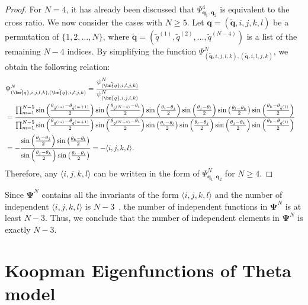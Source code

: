\documentclass[
amsmath,amssymb,
]{revtex4-2}
\begin{document}
\begin{proof}
For $N = 4$, it has already been discussed that $\Psi^4_{\bm{q}_1,\bm{q}_2}$ is equivalent to the cross ratio. 
We now consider the cases with $N \geq 5$. Let $\bm{q} = (\tilde{\bm{q}},i,j,k,l)$ be a permutation of $\{1,2,\ldots,N\}$, where $\tilde{\bm{q}} = (\tilde{q}^{(1)},\tilde{q}^{(2)},\ldots,\tilde{q}^{(N-4)})$ is a list of the remaining $N - 4$ indices.
    By simplifying the function $\Psi^N_{(\tilde{\bm{q}}, i,j,l,k),(\tilde{\bm{q}},i,l,j,k)}$, 
    we obtain the following relation:
    \begin{align}
        &\Psi^N_{(\tilde{\bm{q}},i,j,l,k),(\tilde{\bm{q}},i,l,j,k)}
        = \frac{\psi^N_{(\tilde{\bm{q}},i,l,j,k)}}{\psi^N_{(\tilde{\bm{q}},i,j,l,k)}}\cr
        &=\frac{\prod_{m = 1}^{N-5}\sin\left( \frac{\theta_{\tilde{q}^{(m)}} - \theta_{\tilde{q}^{(m+1)}}}{2} \right)\sin\left( \frac{\theta_{\tilde{q}^{(N-4)}} - \theta_{i}}{2} \right)\sin\left(\frac{\theta_{i}-\theta_{j}}{2}\right)\sin\left(\frac{\theta_{j}-\theta_{l}}{2}\right)\sin\left(\frac{\theta_{l}-\theta_{k}}{2}\right)\sin\left(\frac{\theta_{k}-\theta_{\tilde{q}^{(1)}}}{2}\right)}
        {\prod_{m = 1}^{N-5}\sin\left( \frac{\theta_{\tilde{q}^{(m)}} - \theta_{\tilde{q}^{(m+1)}}}{2} \right)\sin\left( \frac{\theta_{\tilde{q}^{(N-4)}} - \theta_{i}}{2} \right)\sin\left(\frac{\theta_{i}-\theta_{l}}{2}\right)\sin\left(\frac{\theta_{l}-\theta_{j}}{2}\right)\sin\left(\frac{\theta_{j}-\theta_{k}}{2}\right)\sin\left(\frac{\theta_{k}-\theta_{\tilde{q}^{(1)}}}{2}\right)}\cr
        &=-\frac{\sin\left(\frac{\theta_{i}-\theta_{j}}{2}\right)\sin\left(\frac{\theta_{k}-\theta_{l}}{2}\right)}
        {\sin\left(\frac{\theta_{j}-\theta_{k}}{2}\right)\sin\left(\frac{\theta_{l}-\theta_{i}}{2}\right)}
        = -\langle i,j,k,l\rangle.
    \end{align}
    Therefore, any $\langle i,j,k,l\rangle$ can be written in the form of $\Psi^N_{\bm{q}_1,\bm{q}_2}$ for $N \geq 4$.
\end{proof}

Since $\bm{\Psi}^N$ contains all the invariants of the form $\langle i,j,k,l\rangle$ and the number of independent $\langle i,j,k,l\rangle$ is $N-3$~\cite{Marvel2009identical}, the number of independent functions in $\bm{\Psi}^N$ is at least $N-3$. 
Thus, we conclude that the number of independent elements in $\bm{\Psi}^N$ is exactly $N-3$. 

\section{Koopman Eigenfunctions of Theta model}
\end{document}
